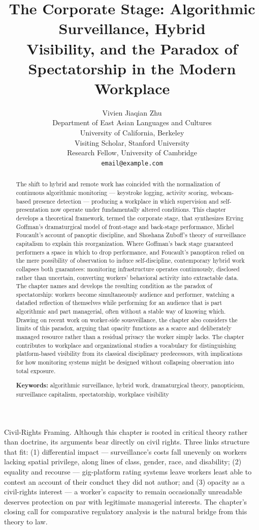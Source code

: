 \documentclass[12pt]{article}
\title{\Large\bfseries The Corporate Stage: Algorithmic Surveillance, Hybrid\\
Visibility, and the Paradox of Spectatorship in the Modern\\
Workplace}
\author{
Vivien Jiaqian Zhu\\
\small Department of East Asian Languages and Cultures\\
\small University of California, Berkeley\\
\small Visiting Scholar, Stanford University\\
\small Research Fellow, University of Cambridge\\
\small \texttt{email@example.com}
}
\date{}
\begin{document}
\maketitle

\begin{abstract}
\noindent The shift to hybrid and remote work has coincided with the normalization of continuous algorithmic monitoring --- keystroke logging, activity scoring, webcam-based presence detection --- producing a workplace in which supervision and self-presentation now operate under fundamentally altered conditions. This chapter develops a theoretical framework, termed the corporate stage, that synthesizes Erving Goffman's dramaturgical model of front-stage and back-stage performance, Michel Foucault's account of panoptic discipline, and Shoshana Zuboff's theory of surveillance capitalism to explain this reorganization. Where Goffman's back stage guaranteed performers a space in which to drop performance, and Foucault's panopticon relied on the mere possibility of observation to induce self-discipline, contemporary hybrid work collapses both guarantees: monitoring infrastructure operates continuously, disclosed rather than uncertain, converting workers' behavioral activity into extractable data. The chapter names and develops the resulting condition as the paradox of spectatorship: workers become simultaneously audience and performer, watching a datafied reflection of themselves while performing for an audience that is part algorithmic and part managerial, often without a stable way of knowing which. Drawing on recent work on worker-side sousveillance, the chapter also considers the limits of this paradox, arguing that opacity functions as a scarce and deliberately managed resource rather than a residual privacy the worker simply lacks. The chapter contributes to workplace and organizational studies a vocabulary for distinguishing platform-based visibility from its classical disciplinary predecessors, with implications for how monitoring systems might be designed without collapsing observation into total exposure.

\vspace{0.5em}
\noindent\textbf{Keywords:} algorithmic surveillance, hybrid work, dramaturgical theory, panopticism, surveillance capitalism, spectatorship, workplace visibility
\end{abstract}

\begin{callout}{Civil-Rights Framing.}
Although this chapter is rooted in critical theory rather than doctrine, its arguments bear directly on civil rights. Three links structure that fit: (1) differential impact --- surveillance's costs fall unevenly on workers lacking spatial privilege, along lines of class, gender, race, and disability; (2) equality and recourse --- gig-platform rating systems leave workers least able to contest an account of their conduct they did not author; and (3) opacity as a civil-rights interest --- a worker's capacity to remain occasionally unreadable deserves protection on par with legitimate managerial interests. The chapter's closing call for comparative regulatory analysis is the natural bridge from this theory to law.
\end{callout}
\end{document}
